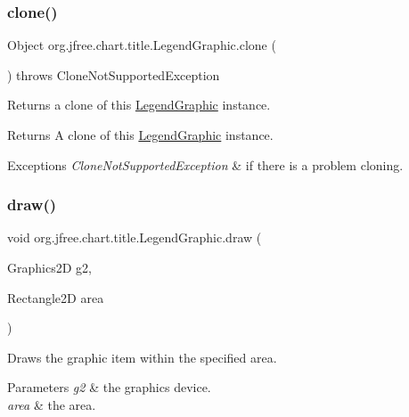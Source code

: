 \subsubsection{\texorpdfstring{clone()}{clone()}}
{\footnotesize\ttfamily Object org.\+jfree.\+chart.\+title.\+Legend\+Graphic.\+clone (\begin{DoxyParamCaption}{ }\end{DoxyParamCaption}) throws Clone\+Not\+Supported\+Exception}

Returns a clone of this {\ttfamily \mbox{\hyperlink{classorg_1_1jfree_1_1chart_1_1title_1_1_legend_graphic}{Legend\+Graphic}}} instance.

\begin{DoxyReturn}{Returns}
A clone of this {\ttfamily \mbox{\hyperlink{classorg_1_1jfree_1_1chart_1_1title_1_1_legend_graphic}{Legend\+Graphic}}} instance.
\end{DoxyReturn}

\begin{DoxyExceptions}{Exceptions}
{\em Clone\+Not\+Supported\+Exception} & if there is a problem cloning. \\
\hline
\end{DoxyExceptions}
\mbox{\label{classorg_1_1jfree_1_1chart_1_1title_1_1_legend_graphic_ad1fb830bbc828b5af54fa7b28909722a}} 
\subsubsection{\texorpdfstring{draw()}{draw()}\hspace{0.1cm}{\footnotesize\ttfamily [1/2]}}
{\footnotesize\ttfamily void org.\+jfree.\+chart.\+title.\+Legend\+Graphic.\+draw (\begin{DoxyParamCaption}\item[{Graphics2D}]{g2,  }\item[{Rectangle2D}]{area }\end{DoxyParamCaption})}

Draws the graphic item within the specified area.


\begin{DoxyParams}{Parameters}
{\em g2} & the graphics device. \\
\hline
{\em area} & the area. \\
\hline
\end{DoxyParams}
\mbox{\label{classorg_1_1jfree_1_1chart_1_1title_1_1_legend_graphic_ac29f7144d623700d566b65c515723bef}} 
